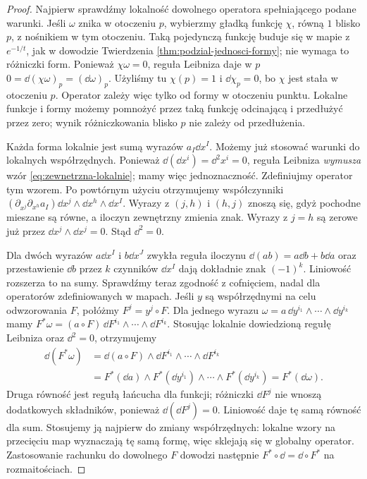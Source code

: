 \begin{proof}
Najpierw sprawdźmy lokalność dowolnego operatora spełniającego
podane warunki. Jeśli $\omega$ znika w otoczeniu $p$, wybierzmy
gładką funkcję $\chi$, równą $1$ blisko $p$, z nośnikiem
w tym otoczeniu. Taką pojedynczą funkcję buduje się w mapie
z $e^{-1/t}$, jak w dowodzie Twierdzenia
\ref{thm:podzial-jednosci-formy}; nie wymaga to różniczki form.
Ponieważ $\chi\omega=0$, reguła Leibniza daje w $p$
$0=\dd(\chi\omega)_p=(\dd\omega)_p$.
Użyliśmy tu $\chi(p)=1$ i $\dd\chi_p=0$, bo $\chi$
jest stała w otoczeniu $p$.
Operator zależy więc tylko od formy w otoczeniu punktu.
Lokalne funkcje i formy możemy pomnożyć przez taką funkcję
odcinającą i przedłużyć przez zero; wynik różniczkowania
blisko $p$ nie zależy od przedłużenia.

Każda forma lokalnie jest sumą wyrazów $a_I\dd x^I$.
Możemy już stosować warunki do lokalnych współrzędnych.
Ponieważ $\dd(\dd x^i)=\dd^2x^i=0$,
reguła Leibniza \emph{wymusza} wzór
\eqref{eq:zewnetrzna-lokalnie}; mamy więc jednoznaczność.
Zdefiniujmy operator tym wzorem. Po powtórnym użyciu
otrzymujemy współczynniki
$(\partial_{x^j}\partial_{x^h}a_I)
\dd x^j\wedge\dd x^h\wedge\dd x^I$.
Wyrazy z $(j,h)$ i $(h,j)$ znoszą się, gdyż pochodne
mieszane są równe, a iloczyn zewnętrzny zmienia znak.
Wyrazy z $j=h$ są zerowe już przez $\dd x^j\wedge\dd x^j=0$.
Stąd $\dd^2=0$.

Dla dwóch wyrazów $a\dd x^I$ i $b\dd x^J$
zwykła reguła iloczynu $\dd(ab)=a\dd b+b\dd a$
oraz przestawienie $\dd b$ przez $k$ czynników
$\dd x^I$ dają dokładnie znak $(-1)^k$.
Liniowość rozszerza to na sumy.
Sprawdźmy teraz zgodność z cofnięciem, nadal dla operatorów
zdefiniowanych w mapach. Jeśli $y$ są współrzędnymi na celu
odwzorowania $F$, połóżmy $F^j=y^j\circ F$.
Dla jednego wyrazu $\omega=a\,\dd y^{i_1}\wedge\cdots\wedge\dd y^{i_k}$
mamy $F^*\omega=(a\circ F)\,\dd F^{i_1}\wedge\cdots\wedge\dd F^{i_k}$.
Stosując lokalnie dowiedzioną regułę Leibniza oraz $\dd^2=0$, otrzymujemy
\[
 \begin{aligned}
 \dd(F^*\omega)
 &=\dd(a\circ F)\wedge\dd F^{i_1}\wedge\cdots\wedge\dd F^{i_k}\\
 &=F^*(\dd a)\wedge F^*(\dd y^{i_1})\wedge\cdots\wedge F^*(\dd y^{i_k})
 =F^*(\dd\omega).
 \end{aligned}
\]
Druga równość jest regułą łańcucha dla funkcji;
różniczki $\dd F^j$ nie wnoszą dodatkowych składników,
ponieważ $\dd(\dd F^j)=0$. Liniowość daje tę samą równość dla sum.
Stosujemy ją najpierw do zmiany współrzędnych:
lokalne wzory na przecięciu map wyznaczają tę samą formę,
więc sklejają się w globalny operator. Zastosowanie rachunku
do dowolnego $F$ dowodzi następnie
$F^*\circ\dd=\dd\circ F^*$ na rozmaitościach.
\end{proof}

